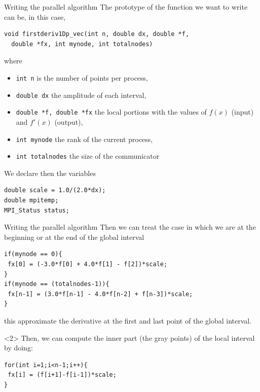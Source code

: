 \documentclass[xcolor={svgnames,usenames}]{beamer}
\begin{document}
\begin{frame}[fragile]{Writing the parallel algorithm}
The prototype of the function we want to write can be, in this case, 
\begin{verbatim}
void firstderiv1Dp_vec(int n, double dx, double *f,
  double *fx, int mynode, int totalnodes)
\end{verbatim}
where
\begin{itemize}
	\item \texttt{int n} is the number of points per process,
	\item \texttt{double dx} the amplitude of each interval,
	\item \texttt{double *f, double *fx} the local portions with the values of $f(x)$ (input) and $f'(x)$ (output),
	\item \texttt{int mynode} the rank of the current process,
	\item \texttt{int totalnodes} the size of the communicator
\end{itemize}
We declare then the variables
\begin{verbatim}
double scale = 1.0/(2.0*dx);
double mpitemp;
MPI_Status status;
\end{verbatim}
\end{frame}

\begin{frame}[fragile]{Writing the parallel algorithm}
Then we can treat the case in which we are at the beginning or at the end of the global interval
\begin{verbatim}
if(mynode == 0){
 fx[0] = (-3.0*f[0] + 4.0*f[1] - f[2])*scale;
}
if(mynode == (totalnodes-1)){
 fx[n-1] = (3.0*f[n-1] - 4.0*f[n-2] + f[n-3])*scale;
}
\end{verbatim}
this approximate the derivative at the first and last point of the global interval. 
\vfill

\begin{onlyenv}<2>
Then, we can compute the inner part (the gray points) of the local interval by doing:
\begin{verbatim}
for(int i=1;i<n-1;i++){
 fx[i] = (f[i+1]-f[i-1])*scale;
}
\end{verbatim}
\end{onlyenv}
\end{frame}
\end{document}
